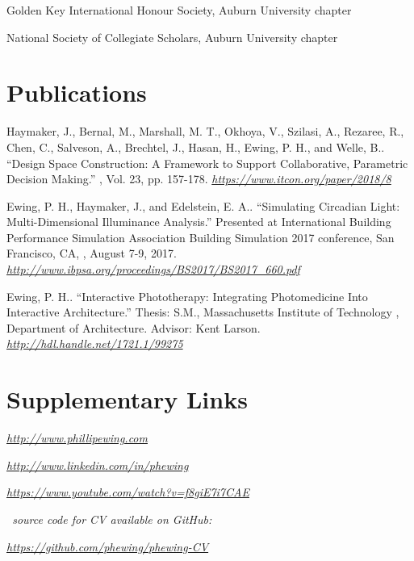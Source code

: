 \documentclass[letterpaper, oneside, 10pt]{article}
\begin{document}
\DotSep{0.25em} Golden Key International
Honour Society, Auburn University chapter

\DotSep{0.25em} National Society of
Collegiate Scholars, Auburn University chapter



\section*{Publications} %

\hangindent=10pt
Haymaker, J., Bernal, M., Marshall, M. T., Okhoya, V., Szilasi, A., Rezaree,
R., Chen, C., Salveson, A., Brechtel, J., Hasan, H., Ewing, P. H., and Welle,
B.. ``Design Space Construction: A Framework to Support
Collaborative, Parametric Decision Making.'' , Vol. 23, pp. 157-178. 
\textit{\url{https://www.itcon.org/paper/2018/8}}

\hangindent=10pt
Ewing, P. H., Haymaker, J., and Edelstein, E. A.. ``Simulating
Circadian Light: Multi-Dimensional Illuminance Analysis.'' Presented at
International Building Performance Simulation Association  Building
Simulation 2017 conference, San Francisco, CA, , August 7-9, 2017.
 \textit{\url{http://www.ibpsa.org/proceedings/BS2017/BS2017_660.pdf}}

\hangindent=10pt
Ewing, P. H.. ``Interactive Phototherapy: Integrating Photomedicine
Into Interactive Architecture.'' Thesis: S.M., Massachusetts Institute of
Technology , Department of Architecture. Advisor: Kent Larson.
 \textit{\url{http://hdl.handle.net/1721.1/99275}}

\suppresstrue

\section*{Supplementary Links} %

\DotSep{0.25em}
\textit{\url{http://www.phillipewing.com}}

\DotSep{0.25em}
\textit{\url{http://www.linkedin.com/in/phewing}}

\DotSep{0.25em}
\textit{\url{https://www.youtube.com/watch?v=f8giE7i7CAE}}

\vfill

\begin{center}

  \textit{\LaTeXe\ source code for CV available on GitHub:}

  \textit{\url{https://github.com/phewing/phewing-CV}}

\end{center}
\end{document}
